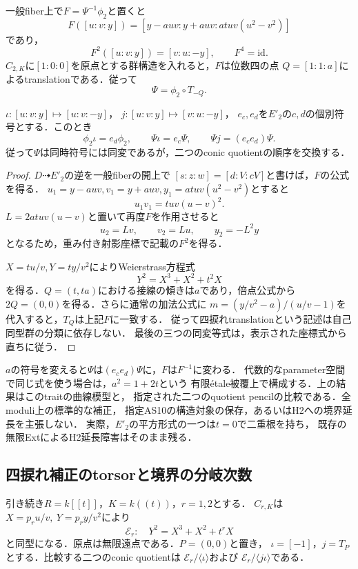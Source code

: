 \begin{proposition}[四捩れtranslationとpencilの交換]
\label{prop:qa-coincident-quarter-period-correction}
一般fiber上で$F=\Psi^{-1}\phi_2$と置くと
\[
 F([u:v:y])=[y-auv:y+auv:at uv(u^2-v^2)]
\]
であり，
\[
 F^2([u:v:y])=[v:u:-y],\qquad F^4=\mathrm{id}.
\]
$C_{2,K}$に$[1:0:0]$を原点とする群構造を入れると，$F$は位数四の点
$Q=[1:1:a]$によるtranslationである．従って
\[
 \Psi=\phi_2\circ T_{-Q}.
\]

$\iota:[u:v:y]\mapsto[u:v:-y]$，
$j:[u:v:y]\mapsto[v:u:-y]$，
$e_c,e_d$を$E'_2$の$c,d$の個別符号とする．このとき
\[
 \phi_2\iota=e_d\phi_2,
 \qquad\Psi\iota=e_c\Psi,
 \qquad\Psi j=(e_ce_d)\Psi.
\]
従って$\Psi$は同時符号には同変であるが，二つのconic quotientの順序を交換する．
\end{proposition}
\begin{proof}
$D\dashrightarrow E'_2$の逆を一般fiberの開上で
$[s:z:w]=[d:V:cV]$と書けば，$F$の公式を得る．
$u_1=y-auv,v_1=y+auv,y_1=at uv(u^2-v^2)$とすると
\[
 u_1v_1=tuv(u-v)^2.
\]
$L=2at uv(u-v)$と置いて再度$F$を作用させると
\[
 u_2=Lv,\qquad v_2=Lu,\qquad y_2=-L^2y
\]
となるため，重み付き射影座標で記載の$F^2$を得る．

$X=t u/v,Y=t y/v^2$によりWeierstrass方程式
\[
 Y^2=X^3+X^2+t^2X
\]
を得る．$Q=(t,ta)$における接線の傾きは$a$であり，倍点公式から
$2Q=(0,0)$を得る．さらに通常の加法公式に
$m=(y/v^2-a)/(u/v-1)$を代入すると，$T_Q$は上記$F$に一致する．
従って四捩れtranslationという記述は自己同型群の分類に依存しない．
最後の三つの同変等式は，表示された座標式から直ちに従う．
\end{proof}

\begin{remark}[選択と主張の範囲]
$a$の符号を変えると$\Psi$は$(e_ce_d)\Psi$に，$F$は$F^{-1}$に変わる．
代数的なparameter空間で同じ式を使う場合は，$a^2=1+2t$という
有限\'etale被覆上で構成する．上の結果はこのtraitの曲線模型と，
指定された二つのquotient pencilの比較である．全moduli上の標準的な補正，
指定AS10の構造対象の保存，あるいはH2への境界延長を主張しない．
実際，$E'_2$の平方形式の一つは$t=0$で二重根を持ち，
既存の無限ExtによるH2延長障害はそのまま残る．
\end{remark}

\subsection{四捩れ補正のtorsorと境界の分岐次数}
\label{subsec:qa-boundary-halving-torsor}

引き続き$R=k[[t]]$，$K=k((t))$，$r=1,2$とする．
$C_{r,K}$は$X=p_ru/v,\ Y=p_ry/v^2$により
\[
 \mathcal E_r:\quad Y^2=X^3+X^2+t^rX
\]
と同型になる．原点は無限遠点である．$P=(0,0)$と置き，
$\iota=[-1]$，$j=T_P$とする．比較する二つのconic quotientは
$\mathcal E_r/\langle\iota\rangle$および
$\mathcal E_r/\langle j\iota\rangle$である．

